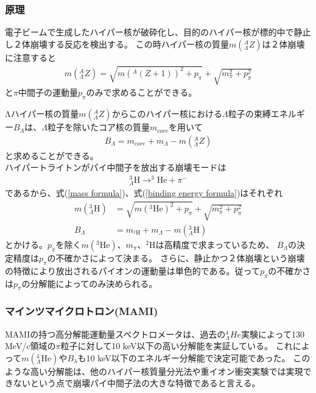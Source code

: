 \documentclass[a4paper,11pt,uplatex]{jsarticle}
\begin{document}
\subsubsection{原理}
電子ビームで生成したハイパー核が破砕化し、目的のハイパー核が標的中で静止し２体崩壊する反応を検出する。
この時ハイパー核の質量$m(^A_{\Lambda}Z)$は２体崩壊に注意すると
\begin{eqnarray}
  m(^A_{\Lambda}Z) = \sqrt{m(^A(Z+1))^2 + p_\pi} + \sqrt{m_\pi^2 + p_\pi^2} \label{mass formula}
\end{eqnarray}
と$\pi$中間子の運動量$p_\pi$のみで求めることができる。

Λハイパー核の質量$m(^A_\Lambda Z)$からこのハイパー核における$\Lambda$粒子の束縛エネルギー$B_\Lambda$は、$\Lambda$粒子を除いたコア核の質量$m_{core}$を用いて
\begin{eqnarray}
  B_\Lambda = m_{core} + m_\Lambda - m(^A_\Lambda Z) \label{binding energy formula}
\end{eqnarray}
と求めることができる。
\\ハイパートライトンがパイ中間子を放出する崩壊モードは
\begin{eqnarray}
  ^3_{\Lambda}\text{H} \rightarrow ^3\text{He} + \pi^-
\end{eqnarray}
であるから、式(\ref{mass formula})、式(\ref{binding energy formula})はそれぞれ
\begin{eqnarray}
  m(^3_\Lambda \text{H}) &= \sqrt{m(^3\text{He})^2 + p_\pi} + \sqrt{m_\pi^2 + p_\pi^2} \\
  B_\Lambda &= m_{^2\text{H}} + m_\Lambda - m(^3_\Lambda \text{H})
\end{eqnarray}
とかける。$p_\pi$を除く$m(^3\text{He})$、$m_\pi$、$^2\text{H}$は高精度で求まっているため、
$B_\Lambda$の決定精度は$p_\pi$の不確かさによって決まる。
さらに、静止かつ２体崩壊という崩壊の特徴により放出されるパイオンの運動量は単色的である。従って$p_\pi$の不確かさは$p_\pi$の分解能によってのみ決められる。\\
\subsubsection{マインツマイクロトロン(MAMI)}
MAMIの持つ高分解能運動量スペクトロメータは、過去の$^4_\Lambda He$実験によって130 MeV/c領域の$\pi$粒子に対して10 keV以下の高い分解能を実証している。
これによって$m(^4_\Lambda \text{He})$や$B_\lambda$も10 keV以下のエネルギー分解能で決定可能であった。
このような高い分解能は、他のハイパー核質量分光法や重イオン衝突実験では実現できないという点で崩壊パイ中間子法の大きな特徴であると言える。
\end{document}
